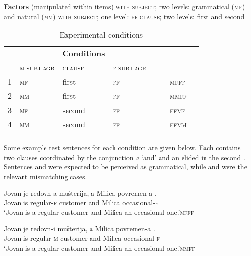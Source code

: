\documentclass[output=paper,modfonts,newtxmath,hidelinks]{langscibook}
\begin{document}
 \ea \textbf{Factors} (manipulated within items)\label{14:ex9}
  			\ea \textsc{ with  subject}; two levels: grammatical (\textsc{mf}) and natural (\textsc{mm})\label{14:ex9a}
  			\ex \textsc{ with  subject}; one level: \textsc{ff} \label{14:ex9b}
  			\ex \textsc{clause}; two levels: first and second\label{14:ex9c}
            \z \z
 
\begin{table}[h]
  		\centering
  		\begin{tabularx}{0.8\textwidth}{llp{2cm}llll}
		\lsptoprule
  			\multicolumn{4}{c}{\textbf{Factors and levels}} & & \textbf{Conditions}\\
  			& \textsc{m.subj.agr}         & \textsc{clause} & \textsc{f.subj.agr}  &               & \\
			\midrule
  			1  & \textsc{mf}     & first  & \textsc{ff}          & ~~  & \textsc{mfff} \\
  			2  & \textsc{mm}     & first  & \textsc{ff}          &     & \textsc{mmff} \\	
  			3  & \textsc{mf}     & second & \textsc{ff}          &   & \textsc{ffmf} \\
  			4  & \textsc{mm}     & second & \textsc{ff}          &    &  \textsc{ffmm} \\\lspbottomrule
  		\end{tabularx}
  		\caption{\label{14:table:experimconditions}Experimental conditions}
  	\end{table}	

\noindent Some example test sentences for each condition are given below. Each contains two clauses coordinated by the conjunction \textit{a} `and' and an elided  in the second . Sentences  and  were expected to be perceived as grammatical, while  and  were the relevant mismatching cases.
 
 
\ea \gll Jovan je redovn{-a} mušterija, a Milica povremen{-a} \underline{\hspace{1.5cm}}.\\
  		Jovan is regular{-\textsc{f}} customer and Milica occasional{-\textsc{f}}\\
  		\glt `Jovan is a regular customer and Milica an occasional one.'\hfill \textsc{mfff}\label{14:ex10}
        \z
  		
  		\ea \gll Jovan je redovn{-i} mušterija, a Milica povremen{-a} \underline{\hspace{1.5cm}}.\\
  		Jovan is regular{-\textsc{m}} customer and Milica occasional{-\textsc{f}}\\
  		\glt `Jovan is a regular customer and Milica an occasional one.'\hfill  \textsc{mmff}\label{14:ex11}
        \z
 
\end{document}
